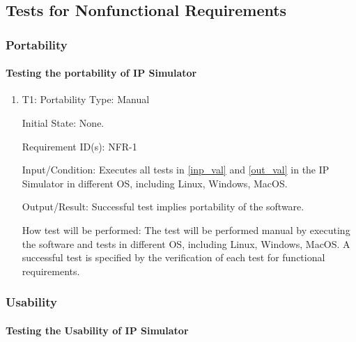 \documentclass[12pt, titlepage]{article}
\begin{document}
\subsection{Tests for Nonfunctional Requirements}

\subsubsection{Portability\label{nfr1}}

\paragraph{Testing the portability of IP Simulator}

\begin{enumerate}

\item{T1: Portability}
\vspace{3mm}
\newline
Type: Manual
					
Initial State: None. 

Requirement ID(s): NFR-1					

Input/Condition: Executes all tests in \ref{inp_val} and \ref{out_val} in the IP Simulator in different OS, including Linux, Windows, MacOS.
					
Output/Result: Successful test implies portability of the software.

How test will be performed: The test will be performed manual by executing the software and tests in different OS, including Linux, Windows, MacOS. A successful test is specified by the verification of
each test for functional requirements. 
				
\end{enumerate}
\subsubsection{Usability\label{nfr2}}

\paragraph{Testing the Usability of IP Simulator}
\end{document}
